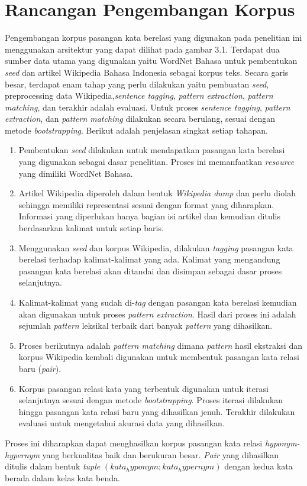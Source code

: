 \section{Rancangan Pengembangan Korpus}
Pengembangan korpus pasangan kata berelasi yang digunakan pada penelitian ini menggunakan arsitektur yang dapat dilihat pada gambar 3.1. Terdapat dua sumber data utama yang digunakan yaitu WordNet Bahasa untuk pembentukan \textit{seed} dan artikel Wikipedia Bahasa Indonesia sebagai korpus teks. Secara garis besar, terdapat enam tahap yang perlu dilakukan yaitu pembuatan \textit{seed}, preprocessing data Wikipedia,\textit{sentence tagging}, \textit{pattern extraction}, \textit{pattern matching}, dan terakhir adalah evaluasi. Untuk proses \textit{sentence tagging}, \textit{pattern extraction}, dan \textit{pattern matching} dilakukan secara berulang, sesuai dengan metode \textit{bootstrapping}. Berikut adalah penjelasan singkat setiap tahapan.
\begin{enumerate}
  \item Pembentukan \textit{seed} dilakukan untuk mendapatkan pasangan kata berelasi yang digunakan sebagai dasar penelitian. Proses ini memanfaatkan \textit{resource} yang dimiliki WordNet Bahasa.
  \item Artikel Wikipedia diperoleh dalam bentuk \textit{Wikipedia dump} dan perlu diolah sehingga memiliki representasi sesuai dengan format yang diharapkan. Informasi yang diperlukan hanya bagian isi artikel dan kemudian ditulis berdasarkan kalimat untuk setiap baris.
  \item Menggunakan \textit{seed} dan korpus Wikipedia, dilakukan \textit{tagging} pasangan kata berelasi terhadap kalimat-kalimat yang ada. Kalimat yang mengandung pasangan kata berelasi akan ditandai dan disimpan sebagai dasar proses selanjutnya.
  \item Kalimat-kalimat yang sudah di-\textit{tag} dengan pasangan kata berelasi kemudian akan digunakan untuk proses \textit{pattern extraction}. Hasil dari proses ini adalah sejumlah \textit{pattern} leksikal terbaik dari banyak \textit{pattern} yang dihasilkan.
  \item Proses berikutnya adalah \textit{pattern matching} dimana \textit{pattern} hasil ekstraksi dan korpus Wikipedia kembali digunakan untuk membentuk pasangan kata relasi baru (\textit{pair}).
  \item Korpus pasangan relasi kata yang terbentuk digunakan untuk iterasi selanjutnya sesuai dengan metode \textit{bootstrapping}. Proses iterasi dilakukan hingga pasangan kata relasi baru yang dihasilkan jenuh. Terakhir dilakukan evaluasi untuk mengetahui akurasi data yang dihasilkan.
\end{enumerate}
Proses ini diharapkan dapat menghasilkan korpus pasangan kata relasi \textit{hyponym-hypernym} yang berkualitas baik dan berukuran besar. \textit{Pair} yang dihasilkan ditulis dalam bentuk \textit{tuple} $(kata_hyponym;kata_hypernym)$ dengan kedua kata berada dalam kelas kata benda.


